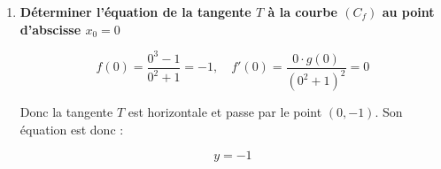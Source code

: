 \documentclass[a4paper,12pt]{article}
\begin{document}
\begin{enumerate}
\begin{center}
\end{center}

\vspace{0.4cm}

\item \textbf{Déterminer l’équation de la tangente \( T \) à la courbe \( (C_f) \) au point d’abscisse \( x_0 = 0 \)}

\[
f(0) = \frac{0^3 - 1}{0^2 + 1} = -1, \quad
f'(0) = \frac{0 \cdot g(0)}{(0^2 + 1)^2} = 0
\]

Donc la tangente \( T \) est horizontale et passe par le point \( (0, -1) \). Son équation est donc :

\[
\boxed{y = -1}
\]

\end{enumerate}
\end{document}
